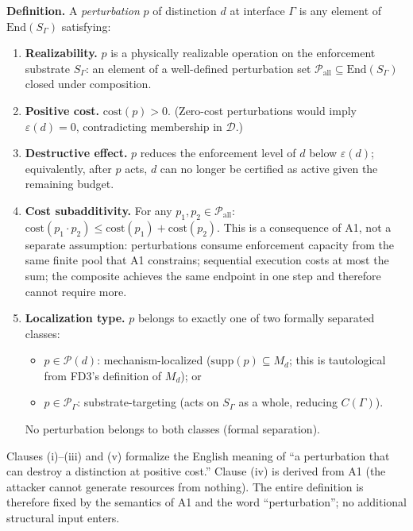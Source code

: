 \documentclass[11pt]{article}
\theoremstyle{remark}
\begin{document}
\begin{tcolorbox}[defbox, title={$\mathrm{FD4b}$ (Definition: Admissible Perturbation)}]

\noindent\textbf{Definition.}  A \emph{perturbation} $p$ of distinction $d$ at interface $\Gamma$ is any element of $\mathrm{End}(S_\Gamma)$ satisfying:
\begin{enumerate}[nosep,leftmargin=2em,itemsep=3pt,label=(\roman*)]
  \item \textbf{Realizability.}  $p$ is a physically realizable operation on the enforcement substrate $S_\Gamma$: an element of a well-defined perturbation set $\mathcal{P}_{\mathrm{all}} \subseteq \mathrm{End}(S_\Gamma)$ closed under composition.
  \item \textbf{Positive cost.}  $\mathrm{cost}(p) > 0$.  (Zero-cost perturbations would imply $\varepsilon(d) = 0$, contradicting membership in $\mathcal{D}$.)
  \item \textbf{Destructive effect.}  $p$ reduces the enforcement level of $d$ below $\varepsilon(d)$; equivalently, after $p$ acts, $d$ can no longer be certified as active given the remaining budget.
  \item \textbf{Cost subadditivity.}  For any $p_1, p_2 \in \mathcal{P}_{\mathrm{all}}$: $\mathrm{cost}(p_1 \cdot p_2) \le \mathrm{cost}(p_1) + \mathrm{cost}(p_2)$.  This is a consequence of A1, not a separate assumption: perturbations consume enforcement capacity from the same finite pool that A1 constrains; sequential execution costs at most the sum; the composite achieves the same endpoint in one step and therefore cannot require more.
  \item \textbf{Localization type.}  $p$ belongs to exactly one of two formally separated classes:
    \begin{itemize}[nosep,leftmargin=2em,itemsep=1pt]
      \item $p \in \mathcal{P}(d)$: mechanism-localized ($\mathrm{supp}(p) \subseteq M_d$; this is tautological from FD3's definition of $M_d$); or
      \item $p \in \mathcal{P}_\Gamma$: substrate-targeting (acts on $S_\Gamma$ as a whole, reducing $C(\Gamma)$).
    \end{itemize}
    No perturbation belongs to both classes (formal separation).
\end{enumerate}

Clauses (i)--(iii) and (v) formalize the English meaning of ``a perturbation that can destroy a distinction at positive cost.''  Clause (iv) is derived from A1 (the attacker cannot generate resources from nothing).  The entire definition is therefore fixed by the semantics of A1 and the word ``perturbation''; no additional structural input enters.


\end{tcolorbox}
\end{document}
